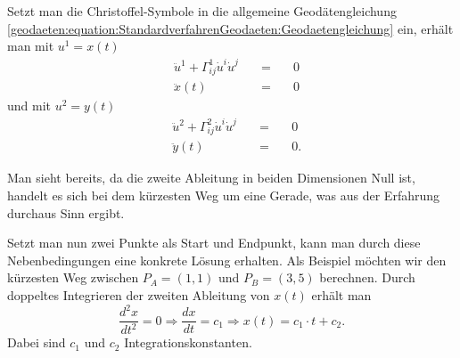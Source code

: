 Setzt man die Christoffel-Symbole in die allgemeine Geodätengleichung \eqref{geodaeten:equation:StandardverfahrenGeodaeten:Geodaetengleichung} ein, erhält man mit $u^1 = x(t)$
\begin{equation}
	\begin{alignedat}{3}
		&\ddot{u}^1 + \Gamma_{ij}^1 \dot{u}^i \dot{u}^j &\quad = \quad& 0 \\
		&\ddot{x}(t) &\quad = \quad& 0
	\end{alignedat}
	\label{geodaeten:equation:Standardverfahren:Kartesisch:x}
\end{equation}
und mit $u^2 = y(t)$
\begin{equation}
	\begin{alignedat}{3}
		&\ddot{u}^2 + \Gamma_{ij}^2 \dot{u}^i \dot{u}^j &\quad = \quad& 0 \\
		&\ddot{y}(t) &\quad = \quad& 0  .
	\end{alignedat}
	\label{geodaeten:equation:Standardverfahren:Kartesisch:y}
\end{equation}

Man sieht bereits, da die zweite Ableitung in beiden Dimensionen Null ist, handelt es sich bei dem kürzesten Weg um eine Gerade, was aus der Erfahrung durchaus Sinn ergibt.

Setzt man nun zwei Punkte als Start und Endpunkt, kann man durch diese Nebenbedingungen eine konkrete Lösung erhalten.
Als Beispiel möchten wir den kürzesten Weg zwischen $P_A = (1,1)$ und $P_B = (3,5)$ berechnen. 
Durch doppeltes Integrieren der zweiten Ableitung von $x(t)$ erhält man
\begin{equation}
	\frac{d^2x}{dt^2} = 0 
	\Rightarrow \frac{dx}{dt} = c_1 
	\Rightarrow x(t) = c_1 \cdot t + c_2  .
	\label{geodaeten:equation:Standardverfahren:Kartesisch:equation1}
\end{equation}
Dabei sind $c_1$  und $c_2$ Integrationskonstanten. 

